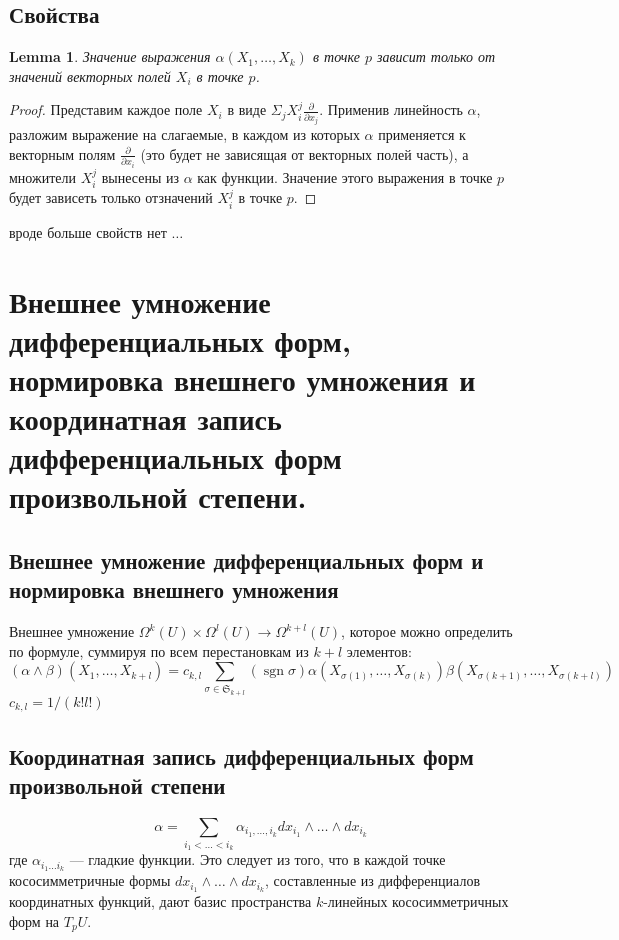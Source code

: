 \documentclass[a4paper,12pt]{article} %
\newtheorem{lemma}[theorem]{Lemma}
\theoremstyle{definition}
\DeclareMathOperator{\sgn}{\mathop{sgn}}
\begin{document}
\subsection{Свойства}
\begin{lemma}
	Значение выражения $\alpha(X_1,\dots,X_k)$ в точке $p$ зависит только от значений векторных полей $X_i$ в точке $p$.
\end{lemma}
\begin{proof}
	Представим каждое поле $X_i$ в виде $\Sigma_j X^j_i \frac{\partial}{\partial x_j}$. Применив линейность $\alpha$, разложим выражение на слагаемые, в каждом из которых $\alpha$ применяется к векторным полям $\frac{\partial}{\partial x_i}$ (это будет не зависящая от векторных полей часть), а множители $X^j_i$ вынесены из $\alpha$ как функции. Значение этого выражения в точке $p$ будет зависеть только отзначений $X^j_i$ в точке $p$.
\end{proof}
вроде больше свойств нет $\dots$
\section{Внешнее умножение дифференциальных форм, нормировка внешнего умножения и координатная запись дифференциальных форм произвольной степени.}
\subsection{Внешнее умножение дифференциальных форм и  нормировка внешнего умножения}
Внешнее умножение $\Omega^k(U) \times \Omega^l (U) \rightarrow \Omega^{k+l}(U)$, которое можно определить по формуле, суммируя по всем перестановкам из $k+l$ элементов:
\begin{equation}
	(\alpha \wedge \beta)(X_1, \dots, X_{k+l}) = c_{k,l} \sum_{\sigma \in \mathfrak{S}_{k+l}} (\sgn \sigma) \alpha(X_{\sigma(1)}, \dots,
	X_{\sigma(k)}) \beta(X_{\sigma(k+1)}, \dots, X_{\sigma(k+l)})
\end{equation}
$c_{k,l} = 1 / (k! l!)$
\subsection{Координатная запись дифференциальных форм произвольной степени}
\begin{equation}
	\alpha = \sum_{i_1 < \dots < i_k} \alpha_{i_1,\dots,i_k} d x_{i_1} \wedge \dots \wedge dx_{i_k}
\end{equation}
где $\alpha_{i_1 \dots i_k}$ --- гладкие функции. Это следует из того, что в каждой точке кососимметричные формы $dx_{i_1}\wedge \dots \wedge dx_{i_k}$, составленные из дифференциалов координатных функций, дают базис пространства $k$-линейных кососимметричных форм на $T_pU$.
\end{document}
